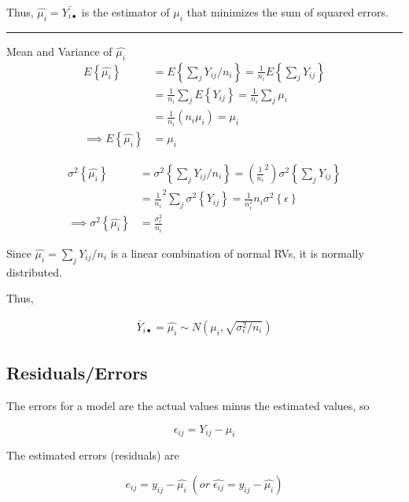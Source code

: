 \documentclass[10pt]{article}
\newcommand{\mean}[1]{\mu_{#1}}
\renewcommand{\exp}[1]{E\left\{#1\right\}} %
\newcommand{\var}[1]{\sigma^2\left\{#1\right\}}
\newcommand{\sigvar}[1]{\sigma^2_{#1}} %
\newcommand{\err}[1]{\epsilon_{#1}}
\newcommand{\drawline}{\noindent\rule{\linewidth}{0.1pt}}
\begin{document}
\begin{multicols}{3}
    Thus, $\hat{\mean{i}} = \bar{Y_{i\bullet}}$ is the estimator of $\mean{i}$ that minimizes the sum of squared errors.

    \drawline

    Mean and Variance of $\hat{\mean{i}}$
    \begin{align*}
        \exp{\hat{\mean{i}}} & = \exp{\sum_j Y_{ij}/n_i} = \frac{1}{n_i} \exp{\sum_j Y_{ij}} \\
            & = \frac{1}{n_i} \sum_j \exp{Y_{ij}} = \frac{1}{n_i} \sum_j \mean{i} \\
            & = \frac{1}{n_i} (n_i \mean{i}) = \mean{i} \\
        \implies \exp{\hat{\mean{i}}} & = \mean{i} 
    \end{align*}

    \begin{align*}
        \var{\hat{\mean{i}}} & = \var{\sum_j Y_{ij}/n_i} = (\frac{1}{n_i}^2) \var{\sum_j Y_{ij}} \\
            & = \frac{1}{n_i}^2 \sum_j \var{Y_{ij}} = \frac{1}{n_i^2} n_i \var{\epsilon} \\
        \implies \var{\hat{\mean{i}}} & = \frac{\sigvar{\epsilon}}{n_i}
    \end{align*}

    Since $\hat{\mean{i}} = \sum_j Y_{ij}/n_i$ is a linear combination of normal RVs, it is normally distributed.

    Thus, 

    \begin{align*}
        \bar Y_{i\bullet} = \hat{\mean{i}} \sim N(\mean{i}, \sqrt{\sigvar{\epsilon}/n_i})
    \end{align*}

    \subsection{Residuals/Errors}

    The errors for a model are the actual values minus the estimated values, so

    \begin{equation*}
        \err{ij} = Y_{ij} - \mean{i}
    \end{equation*}

    The estimated errors (residuals) are 

    \begin{equation*}
        e_{ij} = y_{ij} - \hat{\mean{i}} \; (or \; \hat{\err{ij}} = y_{ij} - \hat{\mean{i}})
    \end{equation*}


\end{multicols}
\end{document}
